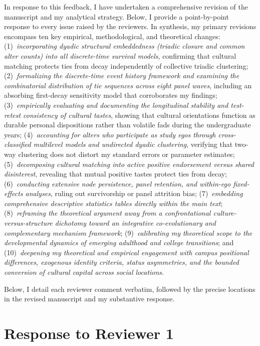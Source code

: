 \documentclass[11pt]{article}
\begin{document}
In response to this feedback, I have undertaken a comprehensive revision of the manuscript and my analytical strategy. Below, I provide a point-by-point response to every issue raised by the reviewers. In synthesis, my primary revisions encompass ten key empirical, methodological, and theoretical changes:
(1)~\textit{incorporating dyadic structural embeddedness (triadic closure and common alter counts) into all discrete-time survival models}, confirming that cultural matching protects ties from decay independently of collective triadic clustering;
(2)~\textit{formalizing the discrete-time event history framework and examining the combinatorial distribution of tie sequences across eight panel waves}, including an absorbing first-decay sensitivity model that corroborates my findings;
(3)~\textit{empirically evaluating and documenting the longitudinal stability and test-retest consistency of cultural tastes}, showing that cultural orientations function as durable personal dispositions rather than volatile fads during the undergraduate years;
(4)~\textit{accounting for alters who participate as study egos through cross-classified multilevel models and undirected dyadic clustering}, verifying that two-way clustering does not distort my standard errors or parameter estimates;
(5)~\textit{decomposing cultural matching into active positive endorsement versus shared disinterest}, revealing that mutual positive tastes protect ties from decay;
(6)~\textit{conducting extensive node persistence, panel retention, and within-ego fixed-effects analyses}, ruling out survivorship or panel attrition bias;
(7)~\textit{embedding comprehensive descriptive statistics tables directly within the main text};
(8)~\textit{reframing the theoretical argument away from a confrontational culture-versus-structure dichotomy toward an integrative co-evolutionary and complementary mechanism framework};
(9)~\textit{calibrating my theoretical scope to the developmental dynamics of emerging adulthood and college transitions}; and
(10)~\textit{deepening my theoretical and empirical engagement with campus positional differences, exogenous identity criteria, status asymmetries, and the bounded conversion of cultural capital across social locations}.

Below, I detail each reviewer comment verbatim, followed by the precise locations in the revised manuscript and my substantive response.

\clearpage

\section*{Response to Reviewer 1}
\end{document}
